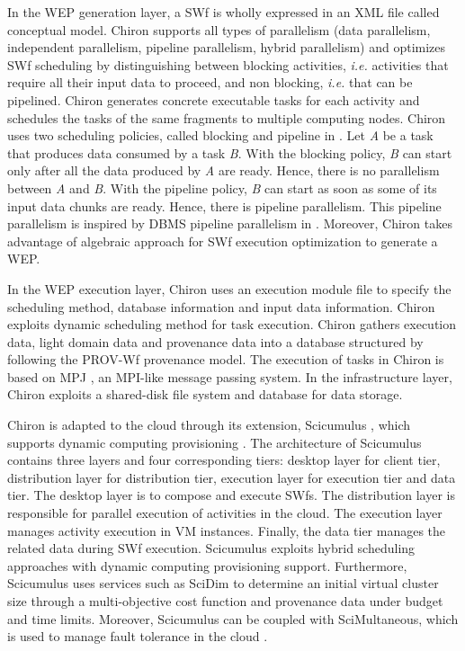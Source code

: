 In the WEP generation layer, a SWf is wholly expressed in an XML file called conceptual model. 
Chiron supports all types of parallelism (data parallelism, independent parallelism,
pipeline parallelism, hybrid parallelism) and optimizes SWf scheduling
by distinguishing between blocking activities, \textit{i.e.} activities that require all their input data to
proceed, and non blocking, \textit{i.e.} that can be pipelined.
Chiron generates concrete executable tasks for each activity and schedules the tasks
of the same fragments to multiple computing nodes.
Chiron uses two scheduling policies, called blocking and pipeline in \cite{Dias2013}. 
Let \textit{A} be a task that produces data consumed by a task \textit{B}.
With the blocking policy, \textit{B} can start only after all the data produced by \textit{A} are ready.
Hence, there is no parallelism between \textit{A} and \textit{B}.
With the pipeline policy, \textit{B} can start as soon as some of its input data chunks are ready. 
Hence, there is pipeline parallelism.
This pipeline parallelism is inspired by DBMS pipeline parallelism in \cite{Ozsu2011}.
Moreover, Chiron takes advantage of algebraic approach for SWf execution optimization to generate a WEP.

In the WEP execution layer, Chiron uses an execution module file
to specify the scheduling method, database information and input data information. 
Chiron exploits dynamic scheduling method for task execution.
Chiron gathers execution data, light domain data and provenance data into a database structured by following the PROV-Wf \cite{Costa2013} provenance model.
The execution of tasks in Chiron is based on MPJ \cite{Carpenter2000}, an MPI-like message passing
system.
In the infrastructure layer, Chiron exploits a shared-disk file system and database for data storage.  

Chiron is adapted to the cloud through its extension, Scicumulus \cite{Oliveira2010,Oliveira2012}, which supports dynamic computing provisioning \cite{Oliveira2012a}. The architecture of Scicumulus contains three layers and four corresponding tiers: desktop layer 
for client tier, distribution layer for distribution tier, execution layer for execution tier and data tier. The desktop layer is to compose and execute SWfs. The distribution layer is responsible for parallel execution of activities in the cloud. 
The execution layer manages activity execution in VM instances. Finally, the data tier manages the related data during SWf execution. Scicumulus exploits hybrid scheduling approaches 
with dynamic computing provisioning support. Furthermore, Scicumulus uses services such as SciDim \cite{Oliveira2013} to determine an initial virtual cluster size through a multi-objective cost function and provenance data under budget and time limits. Moreover, Scicumulus can be coupled with  SciMultaneous, which is used to manage fault tolerance in the cloud \cite{Costa2012}. 


